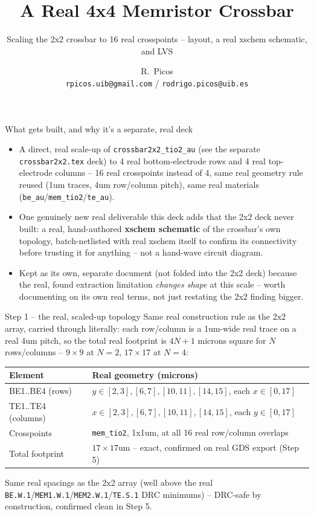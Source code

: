 \documentclass[aspectratio=169,9pt]{beamer}
\title{A Real 4x4 Memristor Crossbar}
\subtitle{Scaling the 2x2 crossbar to 16 real crosspoints -- layout, a real xschem schematic, and LVS}
\author{R.~Picos\\{\small\texttt{rpicos.uib@gmail.com} / \texttt{rodrigo.picos@uib.es}}}
\institute{Project PID2025-170062NB (MemFRAME) funded by\\MICIU/AEI/10.13039/501100011033}
\date{}
\begin{document}
\frame{\titlepage}

\begin{frame}{What gets built, and why it's a separate, real deck}
\footnotesize
\begin{itemize}
  \item A direct, real scale-up of \texttt{crossbar2x2\_tio2\_au}
        (see the separate \texttt{crossbar2x2.tex} deck) to 4 real
        bottom-electrode rows and 4 real top-electrode columns -- 16
        real crosspoints instead of 4, same real geometry rule reused
        (1um traces, 4um row/column pitch), same real materials
        (\texttt{be\_au}/\texttt{mem\_tio2}/\texttt{te\_au}).
  \item One genuinely new real deliverable this deck adds that the
        2x2 deck never built: a real, hand-authored \textbf{xschem
        schematic} of the crossbar's own topology, batch-netlisted
        with real xschem itself to confirm its connectivity before
        trusting it for anything -- not a hand-wave circuit diagram.
  \item Kept as its own, separate document (not folded into the 2x2
        deck) because the real, found extraction limitation
        \emph{changes shape} at this scale -- worth documenting on its
        own real terms, not just restating the 2x2 finding bigger.
\end{itemize}
\end{frame}

\begin{frame}[fragile]{Step 1 -- the real, scaled-up topology}
Same real construction rule as the 2x2 array, carried through
literally: each row/column is a 1um-wide real trace on a real 4um
pitch, so the total real footprint is $4N+1$ microns square for $N$
rows/columns -- $9\times9$ at $N{=}2$, $17\times17$ at $N{=}4$:
\begin{center}
\begin{tabularx}{\textwidth}{lX}
\toprule
Element & Real geometry (microns) \\
\midrule
BE1..BE4 (rows) & $y \in [2,3],[6,7],[10,11],[14,15]$, each $x \in [0,17]$ \\
TE1..TE4 (columns) & $x \in [2,3],[6,7],[10,11],[14,15]$, each $y \in [0,17]$ \\
Crosspoints & \texttt{mem\_tio2}, 1x1um, at all 16 real row/column overlaps \\
Total footprint & $17\times17$um -- exact, confirmed on real GDS export (Step 5) \\
\bottomrule
\end{tabularx}
\end{center}
Same real spacings as the 2x2 array (well above the real
\texttt{BE.W.1}/\texttt{MEM1.W.1}/\texttt{MEM2.W.1}/\texttt{TE.S.1}
DRC minimums) -- DRC-safe by construction, confirmed clean in Step 5.
\end{frame}
\end{document}
